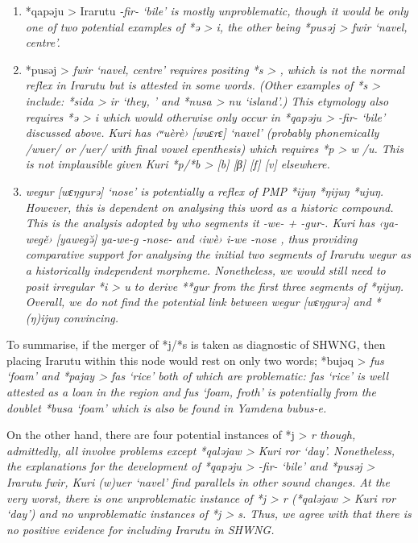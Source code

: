 \begin{enumerate}
	\item	*qapəju > Irarutu \it{-fir-} ‘bile’ is mostly unproblematic,
				though it would be only one of two potential examples of *ə >
				\it{i}, the other being *pusəj > \it{fwir} ‘navel, centre’.
	\item	*pusəj > \it{fwir} ‘navel,
				centre’ requires positing *s > {\0},
				which is not the normal reflex in Irarutu but is attested in some words.
				(Other examples of *s > {\0} include: *sida > \it{ir} ‘they,
				’ and *nusa > \it{nu} ‘island’.) This etymology also
				requires *ə > \it{i} which would otherwise only occur in *qapəju
				> \it{-fir-} ‘bile’ discussed above.
				Kuri has ‹ʷuèrè› [wuɛrɛ] ‘navel’ (probably phonemically /wuer/
				or /uer/ with final vowel epenthesis) which requires *p > \it{w} /{\gap}\it{u}.
				This is not implausible given Kuri *p/*b > [b] {\tl} [β] {\tl}
				[f] {\tl} [v] elsewhere.
	\item	\it{wegur} [wɛŋgurə] ‘nose’ is potentially a reflex of
				PMP *ijuŋ {\tl} *ŋijuŋ {\tl} *ujuŋ.
				However, this is dependent on analysing this word as a historic compound.
				This is the analysis adopted by \citet[125]{Jackson2014} who segments it \it{-we- + -gur-}.
				Kuri has ‹ya-wegě› [yawegə̆] \it{ya-we-g} \tsc{1sg}-nose-
				and ‹iwè› \it{i-we} -nose \citep[34]{SmitsVoorhoeve1992a},
				thus providing comparative support for analysing the initial
				two segments of Irarutu \it{wegur} as a historically independent morpheme.
				Nonetheless, we would still need to posit irregular *i > \it{u}
				to derive **gur from the first three segments of *ŋijuŋ.
				Overall, we do not find the potential link between \it{wegur} [wɛŋgurə]
				and *(ŋ)ijuŋ convincing.
\end{enumerate}

To summarise,
if the merger of *j/*s is taken as diagnostic of SHWNG,
then placing Irarutu within this node would rest on only two
words; *bujəq > \it{fus} ‘foam’
and *pajay > \it{fas} ‘rice’ both of which are problematic: \it{fas}
‘rice’ is well attested as a loan in the region
and \it{fus} ‘foam, froth’ is potentially from the doublet *busa
‘foam’ which is also be found in Yamdena \it{bu{\tl}bus-e}.

On the other hand,
there are four potential instances of *j > \it{r} though,
admittedly, all involve problems except *qaləjaw > Kuri \it{ror} ‘day’.
Nonetheless, the explanations for the development of *qapəju
> \it{-fir-} ‘bile’ and *pusəj > Irarutu \it{fwir},
Kuri \it{(w)uer} ‘navel’ find parallels in other sound changes.
At the very worst,
there is one unproblematic instance of *j > \it{r} (*qaləjaw
> Kuri \it{ror} ‘day’)
and no unproblematic instances of *j > \it{s}.
Thus, we agree with \citet{Blust1993} that there is no positive
evidence for including Irarutu in SHWNG.

